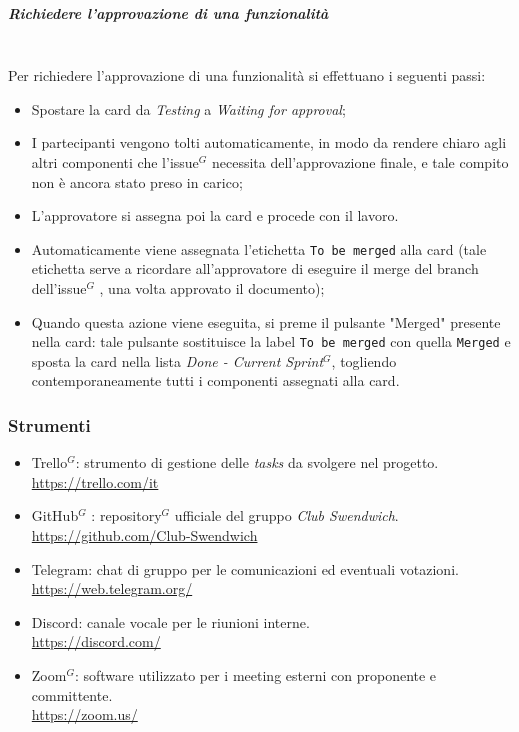 \subparagraph{Richiedere l'approvazione di una funzionalità}
\mbox{}\\
Per richiedere l'approvazione di una funzionalità si effettuano i seguenti passi:
\begin{itemize}
    \item Spostare la card da \textit{Testing} a \textit{Waiting for approval};
    \item I partecipanti vengono tolti automaticamente, in modo da rendere chiaro agli altri componenti che l'issue$^G$  necessita dell'approvazione finale, e tale compito non è ancora stato preso in carico;
    \item L'approvatore si assegna poi la card e procede con il lavoro.
    \item Automaticamente viene assegnata l'etichetta \texttt{To be merged} alla card (tale etichetta serve a ricordare all'approvatore di eseguire il merge del branch dell'issue$^G$ , una volta approvato il documento);
    \item Quando questa azione viene eseguita, si preme il pulsante "Merged" presente nella card: tale pulsante sostituisce la label \texttt{To be merged} con quella \texttt{Merged} e sposta la card nella lista \textit{Done - Current Sprint}$^G$, togliendo contemporaneamente tutti i componenti assegnati alla card.
\end{itemize}

\subsubsection{Strumenti}

\begin{itemize}
    \item Trello$^G$: strumento di gestione delle \textit{tasks} da svolgere nel progetto. \\
    \href{https://trello.com/it}{https://trello.com/it}
    \item GitHub$^G$ : repository$^G$  ufficiale del gruppo \textit{Club Swendwich}.\\
    \href{https://github.com/Club-Swendwich}{https://github.com/Club-Swendwich}
    \item Telegram: chat di gruppo per le comunicazioni ed eventuali votazioni. \\
    \href{https://web.telegram.org/}{https://web.telegram.org/}
    \item Discord: canale vocale per le riunioni interne.\\
    \href{https://discord.com/}{https://discord.com/}
    \item Zoom$^{G}$: software utilizzato per i meeting esterni con proponente e committente.\\
    \href{https://zoom.us/}{https://zoom.us/}
\end{itemize}
